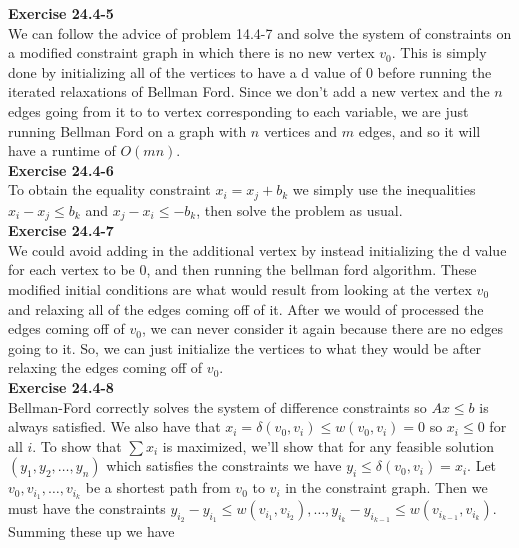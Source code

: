 \documentclass{article}
\begin{document}
\noindent\textbf{Exercise 24.4-5}\\

We can follow the advice of problem 14.4-7 and solve the system of constraints on a modified constraint graph in which there is no new vertex $v_0$. This is simply done by initializing all of the vertices to have a d value of 0 before running the iterated relaxations of Bellman Ford. Since we don't add a new vertex and the $n$ edges going from it to to vertex corresponding to each variable, we are just running Bellman Ford on a graph with $n$ vertices and $m$ edges, and so it will have a runtime of $O(mn)$.\\

\noindent\textbf{Exercise 24.4-6}\\

To obtain the equality constraint $x_i = x_j + b_k$ we simply use the inequalities $x_i - x_j \leq b_k$ and $x_j - x_i \leq -b_k$, then solve the problem as usual. \\


\noindent\textbf{Exercise 24.4-7}\\

We could avoid adding in the additional vertex by instead initializing the d value for each vertex to be 0, and then running the bellman ford algorithm. These modified initial conditions are what would result from looking at the vertex $v_0$ and relaxing all of the edges coming off of it. After we would of processed the edges coming off of $v_0$, we can never consider it again because there are no edges going to it. So, we can just initialize the vertices to what they would be after relaxing the edges coming off of $v_0$.\\

\noindent\textbf{Exercise 24.4-8}\\

Bellman-Ford correctly solves the system of difference constraints so $Ax\leq b$ is always satisfied. We also have that $x_i = \delta(v_0, v_i) \leq w(v_0, v_i) = 0$ so $x_i \leq 0$ for all $i$.  To show that $\sum x_i$ is maximized, we'll show that for any feasible solution $(y_1, y_2, \ldots, y_n)$ which satisfies the constraints we have $y_i \leq \delta(v_0, v_i) = x_i$.  Let $v_0, v_{i_1}, \ldots, v_{i_k}$ be a shortest path from $v_0$ to $v_i$ in the constraint graph.  Then we must have the constraints $y_{i_2} - y_{i_1} \leq w(v_{i_1}, v_{i_2}), \ldots, y_{i_k} - y_{i_{k-1}} \leq w(v_{i_{k-1}}, v_{i_k})$.  Summing these up we have 
\end{document}
